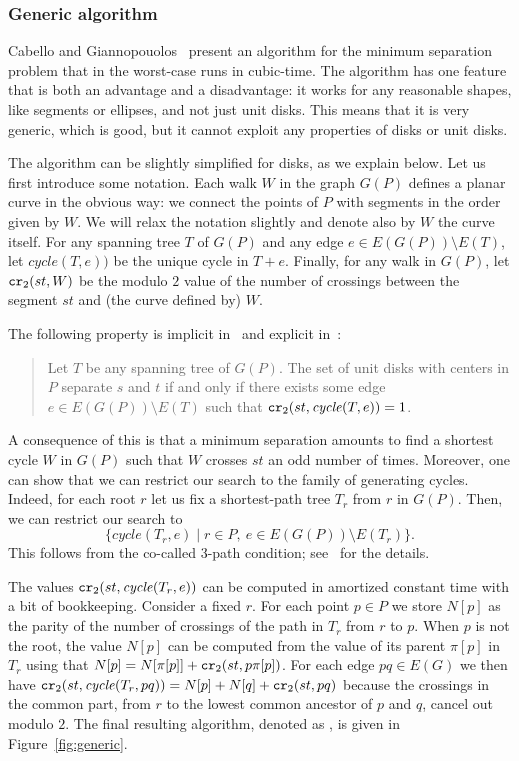 \documentclass[a4paper,USenglish,numberwithinsect]{lipics}
\newcommand{\cycle}{\mathit{cycle}}
\newcommand\CR{\mbox{\tt cr}_2}		  %
\begin{document}
\subsubsection{Generic algorithm}
Cabello and Giannopouolos~\cite{CG16} present an algorithm
for the minimum separation problem that in the worst-case runs in cubic-time.
The algorithm has one feature that is both an advantage and a disadvantage: 
it works for any reasonable shapes, like segments or ellipses, and not just unit disks.
This means that it is very generic, which is good,
but it cannot exploit any properties of disks or unit disks.

The algorithm can be slightly simplified for disks, as we explain below. 
Let us first introduce some notation.
Each walk $W$ in the graph $G(P)$ defines a planar curve
in the obvious way: we connect the points of $P$ 
with segments in the order given by $W$. 
We will relax the notation slightly and denote also by $W$ the curve itself.
For any spanning tree $T$ of $G(P)$ and any edge $e\in E(G(P))\setminus E(T)$, 
let $\cycle(T,e))$ be the unique cycle in $T+e$.
Finally, for any walk in $G(P)$, let $\CR (st,W)$ be the 
modulo $2$ value of the number of crossings between the segment $st$ 
and (the curve defined by) $W$.

The following property is implicit in~\cite{CG16} and explicit in~\cite{CK15}:
\begin{quote}
	Let $T$ be any spanning tree of $G(P)$.
	The set of unit disks with centers in $P$ separate $s$ and $t$ if and only
	if there exists some edge $e\in E(G(P))\setminus E(T)$ 
	such that $\CR (st, \cycle(T,e))=1$.
\end{quote}

A consequence of this is that a minimum separation amounts to find a shortest
cycle $W$ in $G(P)$ such that $W$ crosses $st$ an odd number of times.
Moreover, one can show that we can restrict our search to the family 
of generating cycles. Indeed, for each root $r$ let us fix a 
shortest-path tree $T_r$ from $r$ in $G(P)$.
Then, we can restrict our search to
\[
	\{ \cycle(T_r,e)\mid r\in P,~ e\in E(G(P))\setminus E(T_r)\}.
\]
This follows from the co-called 3-path condition; 
see~\cite{CG16} for the details.

The values $\CR (st, \cycle(T_r,e))$ can be computed in amortized constant time
with a bit of bookkeeping. Consider a fixed $r$.
For each point $p\in P$ we store $N[p]$ as the parity of the number of crossings
of the path in $T_r$ from $r$ to $p$. When $p$ is not the root,
the value $N[p]$ can be computed from the value of its parent $\pi[p]$ in $T_r$
using that $N[p]=N[\pi[p]]+\CR(st,p\pi[p])$.
For each edge $pq\in E(G)$ we
then have $\CR (st, \cycle(T_r,pq))= N[p]+N[q]+\CR(st,pq)$ because
the crossings in the common part, from $r$ to the lowest common ancestor of $p$ and $q$,
cancel out modulo $2$.
The final resulting algorithm, denoted as ,
is given in Figure~\ref{fig:generic}.
\end{document}
